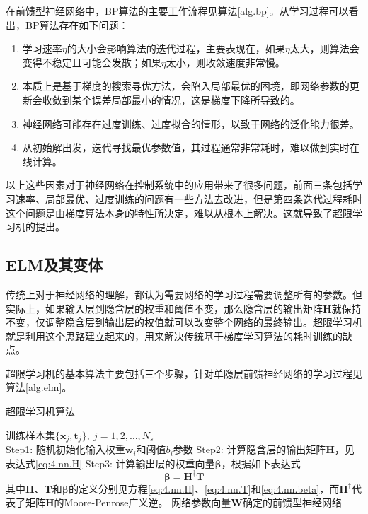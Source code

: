 在前馈型神经网络中，BP算法的主要工作流程见算法\eqref{alg.bp}。从学习过程可以看出，BP算法存在如下问题：
\begin{enumerate}
\item 学习速率$\eta$的大小会影响算法的迭代过程，主要表现在，如果$\eta$太大，则算法会变得不稳定且可能会发散；如果$\eta$太小，则收敛速度非常慢。
\item 本质上是基于梯度的搜索寻优方法，会陷入局部最优的困境，即网络参数的更新会收敛到某个误差局部最小的情况，这是梯度下降所导致的。
\item 神经网络可能存在过度训练、过度拟合的情形，以致于网络的泛化能力很差。
\item 从初始解出发，迭代寻找最优参数值，其过程通常非常耗时，难以做到实时在线计算。
\end{enumerate}

以上这些因素对于神经网络在控制系统中的应用带来了很多问题，前面三条包括学习速率、局部最优、过度训练的问题有一些方法去改进，但是第四条迭代过程耗时这个问题是由梯度算法本身的特性所决定，难以从根本上解决。这就导致了超限学习机的提出。

\subsection{ELM及其变体}
传统上对于神经网络的理解，都认为需要网络的学习过程需要调整所有的参数。但实际上，如果输入层到隐含层的权重和阈值不变，那么隐含层的输出矩阵$\bm{H}$就保持不变，仅调整隐含层到输出层的权值就可以改变整个网络的最终输出。超限学习机就是利用这个思路建立起来的，用来解决传统基于梯度学习算法的耗时训练的缺点。

超限学习机的基本算法主要包括三个步骤，针对单隐层前馈神经网络的学习过程见算法\ref{alg.elm}。
\begin{algo}
\caption{超限学习机算法}
\label{alg.elm}
\begin{algorithmic}%
\REQUIRE 训练样本集$\{\bm{x}_{j},\bm{t}_{j}\},\ j=1,2,\ldots,N_{s}$\\
\STATE Step1: 随机初始化输入权重$\bm{w}_{i}$和阈值$b_{i}$参数
\STATE Step2: 计算隐含层的输出矩阵$\bm{H}$，见表达式\eqref{eq:4.nn.H}
\STATE Step3: 计算输出层的权重向量$\bm{\beta}$，根据如下表达式
\begin{equation}\label{eq:4.elm.beta}
\bm{\beta}=\bm{H}^{\dag}\bm{T}
\end{equation}
其中$\bm{H}$、$\bm{T}$和$\bm{\beta}$的定义分别见方程\eqref{eq:4.nn.H}、\eqref{eq:4.nn.T}和\eqref{eq:4.nn.beta}，而$\bm{H}^{\dag}$代表了矩阵$\bm{H}$的Moore-Penrose广义逆。
\ENSURE 网络参数向量$\bm{W}$确定的前馈型神经网络\\
\end{algorithmic}
\end{algo}

